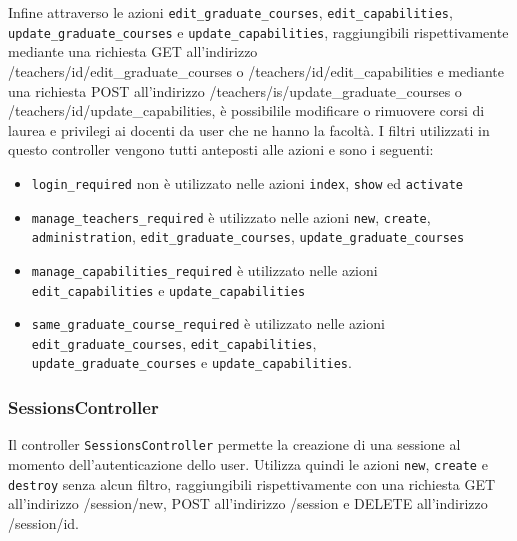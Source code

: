 \documentclass[11pt,a4paper]{article}
\begin{document}
Infine attraverso le azioni \verb|edit_graduate_courses|, \verb|edit_capabilities|, \verb|update_graduate_courses| e \verb|update_capabilities|, raggiungibili rispettivamente mediante una richiesta GET all'indirizzo \\ /teachers/id/edit\_graduate\_courses o /teachers/id/edit\_capabilities e mediante una richiesta POST all'indirizzo /teachers/is/update\_graduate\_courses o /teachers/id/update\_capabilities, è possibilile modificare o rimuovere corsi di laurea e privilegi ai docenti da user che ne hanno la facoltà.
I filtri utilizzati in questo controller vengono tutti anteposti alle azioni e sono i seguenti:
\begin{itemize}
 \item \verb|login_required| non è utilizzato nelle azioni \verb|index|, \verb|show| ed \verb|activate|
 \item \verb|manage_teachers_required|  è utilizzato nelle azioni \verb|new|, \verb|create|,\\ \verb|administration|, \verb|edit_graduate_courses|, \verb|update_graduate_courses|
 \item \verb|manage_capabilities_required| è utilizzato nelle azioni \\ \verb|edit_capabilities| e \verb|update_capabilities|
 \item \verb|same_graduate_course_required| è utilizzato nelle azioni \\ \verb|edit_graduate_courses|, \verb|edit_capabilities|,\\ \verb|update_graduate_courses| e \verb|update_capabilities|.
\end{itemize}
\subsubsection{SessionsController}
Il controller \verb|SessionsController| permette la creazione di una sessione al momento dell'autenticazione dello user. Utilizza quindi le azioni \verb|new|, \verb|create| e \verb|destroy| senza alcun filtro, raggiungibili rispettivamente con una richiesta GET all'indirizzo /session/new, POST all'indirizzo /session e DELETE all'indirizzo /session/id.
\end{document}
